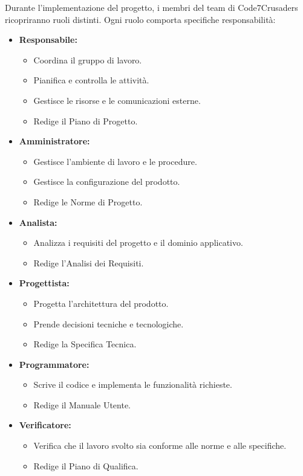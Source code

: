 Durante l'implementazione del progetto, i membri del team di Code7Crusaders ricopriranno ruoli distinti. Ogni ruolo comporta specifiche responsabilità:
\begin{itemize}
    \item \textbf{Responsabile:}
    \begin{itemize}
        \item Coordina il gruppo di lavoro.
        \item Pianifica e controlla le attività.
        \item Gestisce le risorse e le comunicazioni esterne.
        \item Redige il Piano di Progetto.
    \end{itemize}
    \item \textbf{Amministratore:}
    \begin{itemize}
        \item Gestisce l’ambiente di lavoro e le procedure.
        \item Gestisce la configurazione del prodotto.
        \item Redige le Norme di Progetto.
    \end{itemize}
    \item \textbf{Analista:}
    \begin{itemize}
        \item Analizza i requisiti del progetto e il dominio applicativo.
        \item Redige l’Analisi dei Requisiti.
    \end{itemize}
    \item \textbf{Progettista:}
    \begin{itemize}
        \item Progetta l’architettura del prodotto.
        \item Prende decisioni tecniche e tecnologiche.
        \item Redige la Specifica Tecnica.
    \end{itemize}
    \item \textbf{Programmatore:}
    \begin{itemize}
        \item Scrive il codice e implementa le funzionalità richieste.
        \item Redige il Manuale Utente.
    \end{itemize}
    \item \textbf{Verificatore:}
    \begin{itemize}
        \item Verifica che il lavoro svolto sia conforme alle norme e alle specifiche.
        \item Redige il Piano di Qualifica.
    \end{itemize}
\end{itemize}

